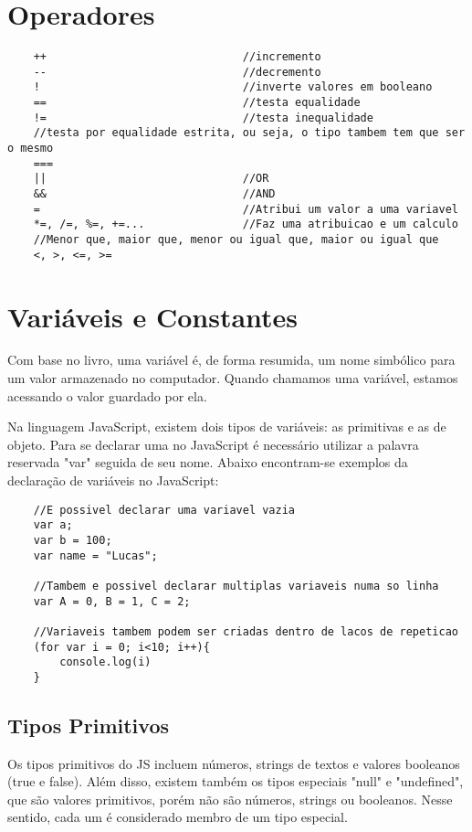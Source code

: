     \section{Operadores}
    \begin{lstlisting}
    ++								//incremento
    --								//decremento
    !								//inverte valores em booleano
    ==								//testa equalidade
    !=								//testa inequalidade
    //testa por equalidade estrita, ou seja, o tipo tambem tem que ser o mesmo
    ===	
    ||								//OR
    &&								//AND
    =								//Atribui um valor a uma variavel
    *=, /=, %=, +=...				//Faz uma atribuicao e um calculo
    //Menor que, maior que, menor ou igual que, maior ou igual que
    <, >, <=, >=
    \end{lstlisting}
    \section{Vari\'{a}veis e Constantes}
    Com base no livro\cite{flanagan2020javascript}, uma variável é, de forma resumida, um nome simbólico para um valor armazenado no computador. Quando chamamos uma variável, estamos acessando o valor guardado por ela. 
   	\par Na linguagem JavaScript, existem dois tipos de variáveis: as primitivas e as de objeto. 
    Para se declarar uma no JavaScript é necessário utilizar a palavra reservada "var" seguida de seu nome. Abaixo encontram-se exemplos da declaração de variáveis no JavaScript:
    \newline
    
    \begin{lstlisting}
    //E possivel declarar uma variavel vazia
    var a;
    var b = 100;
    var name = "Lucas";
    
    //Tambem e possivel declarar multiplas variaveis numa so linha
    var A = 0, B = 1, C = 2;
    
    //Variaveis tambem podem ser criadas dentro de lacos de repeticao
    (for var i = 0; i<10; i++){
    	console.log(i)
    }
    \end{lstlisting}
    
    \subsection{Tipos Primitivos}
    
	Os tipos primitivos do JS incluem números, strings de textos e valores booleanos (true e false).
	Além disso, existem também os tipos especiais "null" e "undefined", que são valores primitivos, porém não são números, strings ou booleanos. Nesse sentido, cada um é considerado membro de um tipo especial.  
